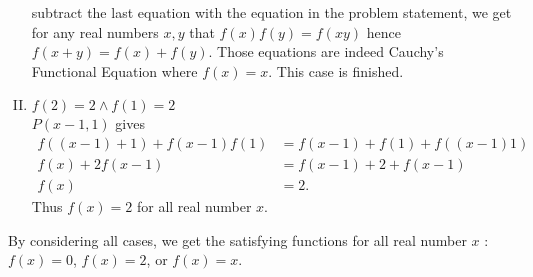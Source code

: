 \begin{solusi}
\begin{enumerate}[I.]
        subtract the last equation with the equation in the problem statement, we get for any real numbers $x,y$ that $f(x)f(y)=f(xy)$ hence $f(x+y)=f(x)+f(y)$. Those equations are indeed Cauchy's Functional Equation where $f(x)=x$. This case is finished.


        \item $f(2)=2 \wedge f(1)=2$\\
        $P(x-1,1)$ gives
        \begin{align*}
            f((x-1)+1) + f(x-1)f(1) &= f(x-1)+f(1)+f((x-1)1)\\
            f(x) + 2f(x-1) &= f(x-1)+2+f(x-1)\\
            f(x) &= 2.
        \end{align*}
        Thus $f(x)=2$ for all real number $x$.
    \end{enumerate}
    By considering all cases, we get the satisfying functions for all real number $x$ : $f(x)=0$, $f(x)=2$, or $f(x)=x$.
\end{solusi}